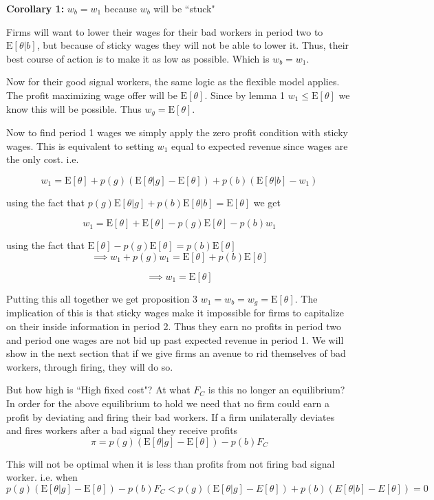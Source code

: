 \documentclass[11pt]{article}
\newcommand{\E}{\mathrm{E}}
\begin{document}
 \textbf{Corollary 1:} $w_b = w_1$ because $w_b$ will be ``stuck"

Firms will want to lower their wages for their bad workers in period two to $\E[\theta |b]$, but because of sticky wages they will not be able to lower it. Thus, their best course of action is to make it as low as possible. Which is $w_b = w_1$. \par 

Now for their good signal workers, the same logic as the flexible model applies. The profit maximizing wage offer will be $\E[\theta]$. Since by lemma 1  $w_1 \leq \E[\theta]$ we know this will be possible. Thus $w_g = \E[\theta]$. \par 

Now to find period 1 wages we simply apply the zero profit condition with sticky wages. This is equivalent to setting $w_1$ equal to expected revenue since wages are the only cost. i.e. 

$$ w_1 = \E[\theta] + p(g)(\E[\theta|g] - \E[\theta]) + p(b)(\E[\theta|b] - w_1) $$

using the fact that $p(g)\E[\theta|g] + p(b)\E[\theta|b] = \E[\theta]$ we get 

$$ w_1 = \E[\theta] + \E[\theta] - p(g)\E[\theta] - p(b)w_1$$

using the fact that $ \E[\theta] - p(g)\E[\theta] = p(b)\E[\theta]$
$$ \implies w_1 +p(g)w_1 = \E[\theta] + p(b)\E[\theta]
$$

$$ \implies w_1 = \E[\theta]$$

Putting this all together we get proposition 3 $w_1 = w_b = w_g =\E[\theta]$. The implication of this is that sticky wages make it impossible for firms to capitalize on their inside information in period 2. Thus they earn no profits in period two and period one wages are not bid up past expected revenue in period 1. We will show in the next section that if we give firms an avenue to rid themselves of bad workers, through firing, they will do so. \par 

But how high is ``High fixed cost"? At what $F_C$ is this no longer an equilibrium? In order for the above equilibrium to hold we need that no firm could earn a profit by deviating and firing their bad workers. If a firm unilaterally deviates and fires workers after a bad signal they receive profits 
$$ \pi = p(g) (\E[\theta|g] - \E[\theta]) - p(b)F_C $$

This will not be optimal when it is less than profits from not firing bad signal worker. i.e. when 
$$  p(g) (\E[\theta|g] - \E[\theta]) - p(b)F_C < p(g)( \E[\theta|g] - E[\theta]) + p(b)(E[\theta|b] - E[\theta]) = 0 $$  
\end{document}
